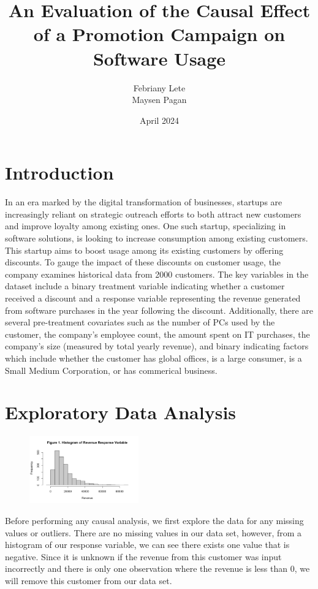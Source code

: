 \documentclass{article}
\author{Febriany Lete \\ Maysen Pagan}
\title{\textbf{An Evaluation of the Causal Effect of a Promotion Campaign on Software Usage}}
\date{April 2024}
\begin{document}
\maketitle
\section{Introduction}
In an era marked by the digital transformation of businesses, startups are increasingly reliant on strategic outreach efforts to both attract new customers and improve loyalty among existing ones. One such startup, specializing in software solutions, is looking to increase consumption among existing customers. This startup aims to boost usage among its existing customers by offering discounts. To gauge the impact of these discounts on customer usage, the company examines historical data from 2000 customers. The key variables in the dataset include a binary treatment variable indicating whether a customer received a discount and a response variable representing the revenue generated from software purchases in the year following the discount. Additionally, there are several pre-treatment covariates such as the number of PCs used by the customer, the company's employee count, the amount spent on IT purchases, the company's size (measured by total yearly revenue), and binary indicating factors which include whether the customer has global offices, is a large consumer, is a Small Medium Corporation, or has commerical business.

\section{Exploratory Data Analysis}

\begin{figure}
\centering
\includegraphics[width=0.42\textwidth]{figs/response_hist.png}
\end{figure}

Before performing any causal analysis, we first explore the data for any missing values or outliers. There are no missing values in our data set, however, from a histogram of our response variable, we can see there exists one value that is negative. Since it is unknown if the revenue from this customer was input incorrectly and there is only one observation where the revenue is less than 0, we will remove this customer from our data set.
\end{document}
